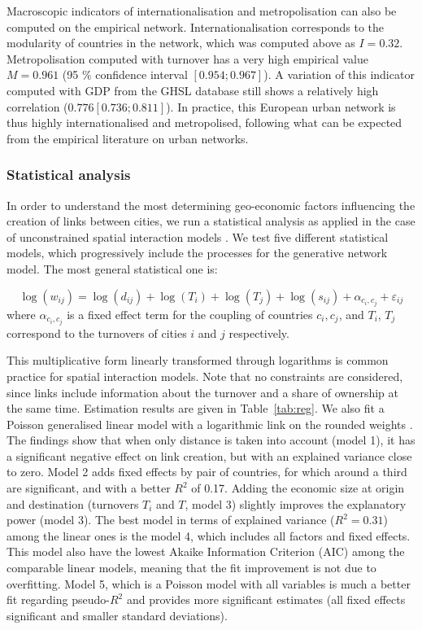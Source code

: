 \documentclass[10pt,letterpaper]{article}
\begin{document}
Macroscopic indicators of internationalisation and metropolisation can also be computed on the empirical network. Internationalisation corresponds to the modularity of countries in the network, which was computed above as $I = 0.32$. Metropolisation computed with turnover has a very high empirical value $M = 0.961$ (95 \% confidence interval $\left[ 0.954 ; 0.967\right]$). A variation of this indicator computed with GDP from the GHSL database still shows a relatively high correlation ($0.776 \left[ 0.736 ; 0.811\right]$). In practice, this European urban network is thus highly internationalised and metropolised, following what can be expected from the empirical literature on urban networks.


\subsubsection*{Statistical analysis}

In order to understand the most determining geo-economic factors influencing the creation of links between cities, we run a statistical analysis as applied in the case of unconstrained spatial interaction models \cite{wilson1975some}. We test five different statistical models, which progressively include the processes for the generative network model. The most general statistical one is:

\begin{equation}
\log(w_{ij}) = \log(d_{ij}) + \log(T_i) + \log(T_j) + \log(s_{ij}) + \alpha_{c_i,c_j} + \varepsilon_{ij}
\end{equation}
where $\alpha_{c_i,c_j}$ is a fixed effect term for the coupling of countries $c_i,c_j$, and $T_i$, $T_j$ correspond to the turnovers of cities $i$ and $j$ respectively. 

This multiplicative form linearly transformed through logarithms is common practice for spatial interaction models. Note that no constraints are considered, since links include information about the turnover and a share of ownership at the same time. Estimation results are given in Table~\ref{tab:reg}. We also fit a Poisson generalised linear model with a logarithmic link on the rounded weights \cite{flowerdew1988fitting}. The findings show that when only distance is taken into account (model 1), it has a significant negative effect on link creation, but with an explained variance close to zero. Model 2 adds fixed effects by pair of countries, for which around a third are significant, and with a better $R^2$ of 0.17. Adding the economic size at origin and destination (turnovers $T_i$ and $T$, model 3) slightly improves the explanatory power (model 3). The best model in terms of explained variance ($R^2 = 0.31$) among the linear ones is the model 4, which includes all factors and fixed effects. This model also have the lowest Akaike Information Criterion (AIC) among the comparable linear models, meaning that the fit improvement is not due to overfitting. Model 5, which is a Poisson model with all variables is much a better fit regarding pseudo-$R^2$ and provides more significant estimates (all fixed effects significant and smaller standard deviations).
\end{document}
